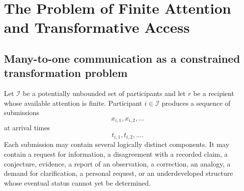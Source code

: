\documentclass[11pt]{article}
\theoremstyle{definition}
\begin{document}
\begin{abstract}
Two principal failure classes are derived. Projection collapse occurs when the quotient identifies submissions that require different authorized dispositions. Gluing obstruction occurs when locally coherent archive, participant, prerequisite, and recipient states cannot be assembled under the declared compatibility maps. These failures are shown to require different forms of repair. Projection collapse may require restoration of a discarded distinction or expansion of the quotient space. Gluing obstruction requires revision of compatibility maps, contextual indexing, or the architecture of assembly. Neither failure is corrected reliably by greater smoothing, stronger similarity matching, or repeated application of the same routing rule.

The treatise derives context-relative \(F\)-sufficiency, fiberwise collapse observables, disposition divergence, provenance preservation conditions, sequential epistemic calibration, prerequisite-path optimization, parameter-mediated coupling, obstruction-sensitive routing, recipient-relative escalation value, exploration reserves, false-suppression estimators, and queueing conditions for stable attention allocation. It concludes that intellectual triage is warranted only when the representation of a submission is sufficient for every authorized disposition and the structures used to interpret that representation admit coherent gluing under auditable compatibility conditions.
\end{abstract}

\section{The Problem of Finite Attention and Transformative Access}

\subsection{Many-to-one communication as a constrained transformation problem}

Let \(\mathcal{I}\) be a potentially unbounded set of participants and let \(r\) be a recipient whose available attention is finite. Participant \(i\in\mathcal{I}\) produces a sequence of submissions
\[
x_{i,1},x_{i,2},\ldots
\]
at arrival times
\[
t_{i,1},t_{i,2},\ldots.
\]
Each submission may contain several logically distinct components. It may contain a request for information, a disagreement with a recorded claim, a conjecture, evidence, a report of an observation, a correction, an analogy, a demand for clarification, a personal request, or an underdeveloped structure whose eventual status cannot yet be determined.
\end{document}
